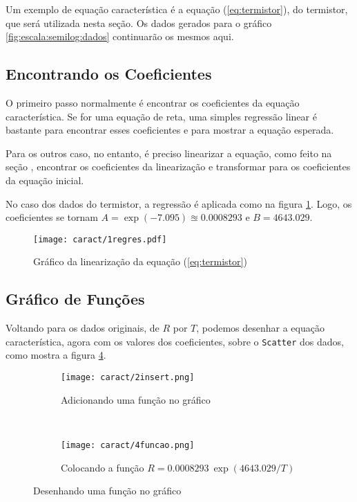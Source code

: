 Um exemplo de equação característica é a equação (\ref{eq:termistor}), do termistor, que será utilizada nesta seção. Os dados gerados para o gráfico \ref{fig:escala:semilog:dados} continuarão os mesmos aqui.

\subsection{Encontrando os Coeficientes}

    O primeiro passo normalmente é encontrar os coeficientes da equação característica. Se for uma equação de reta, uma simples regressão linear é bastante para encontrar esses coeficientes e para mostrar a equação esperada.

    Para os outros caso, no entanto, é preciso linearizar a equação, como feito na seção , encontrar os coeficientes da linearização e transformar para os coeficientes da equação inicial.

    No caso dos dados do termistor, a regressão é aplicada como na figura \ref{fig:caract:regres}. Logo, os coeficientes se tornam $A = \exp(-7.095) \approxeq 0.0008293$ e $B = 4643.029$.

    \begin{figure}[htbp]
        \centering
        \texttt{[image: caract/1regres.pdf]}

        \caption{Gráfico da linearização da equação (\ref{eq:termistor})}
        \label{fig:caract:regres}
    \end{figure}


    \subsection{Gráfico de Funções}

    Voltando para os dados originais, de $R$ por $T$, podemos desenhar a equação característica, agora com os valores dos coeficientes, sobre o \texttt{Scatter} dos dados, como mostra a figura \ref{fig:caract:inserir}.

    \begin{figure}[htbp]
        \centering
        \begin{subfigure}{0.4\textwidth}
            \centering
            \texttt{[image: caract/2insert.png]}

            \caption{Adicionando uma função no gráfico}
            \label{fig:caract:novo}
        \end{subfigure}
        ~
        \begin{subfigure}{0.55\textwidth}
            \centering
            \texttt{[image: caract/4funcao.png]}

            \caption{Colocando a função $R = 0.0008293 ~ \exp(4643.029/T)$}
            \label{fig:caract:funcao}
        \end{subfigure}
        \caption{Desenhando uma função no gráfico}
        \label{fig:caract:inserir}
    \end{figure}


